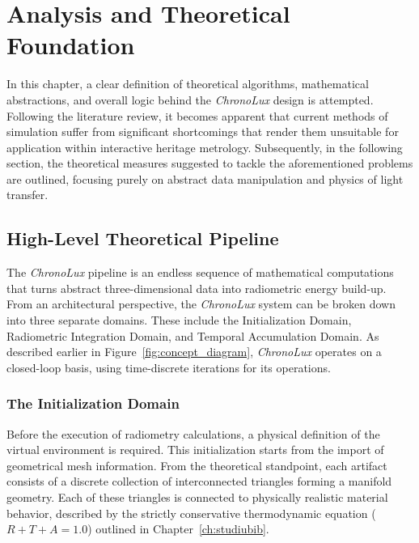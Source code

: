 \chapter{Analysis and Theoretical Foundation}\label{ch:analysis}
\pagestyle{fancy}

In this chapter, a clear definition of theoretical algorithms, mathematical abstractions, and overall logic behind the \textit{ChronoLux} design is attempted. Following the literature review, it becomes apparent that current methods of simulation suffer from significant shortcomings that render them unsuitable for application within interactive heritage metrology. Subsequently, in the following section, the theoretical measures suggested to tackle the aforementioned problems are outlined, focusing purely on abstract data manipulation and physics of light transfer.

\section{High-Level Theoretical Pipeline}\label{sec:theoretical_pipeline}
The \textit{ChronoLux} pipeline is an endless sequence of mathematical computations that turns abstract three-dimensional data into radiometric energy build-up. From an architectural perspective, the \textit{ChronoLux} system can be broken down into three separate domains. These include the Initialization Domain, Radiometric Integration Domain, and Temporal Accumulation Domain. As described earlier in Figure~\ref{fig:concept_diagram}, \textit{ChronoLux} operates on a closed-loop basis, using time-discrete iterations for its operations.

\subsection{The Initialization Domain}
Before the execution of radiometry calculations, a physical definition of the virtual environment is required. This initialization starts from the import of geometrical mesh information. From the theoretical standpoint, each artifact consists of a discrete collection of interconnected triangles forming a manifold geometry. Each of these triangles is connected to physically realistic material behavior, described by the strictly conservative thermodynamic equation ($R + T + A = 1.0$) outlined in Chapter~\ref{ch:studiubib}.

